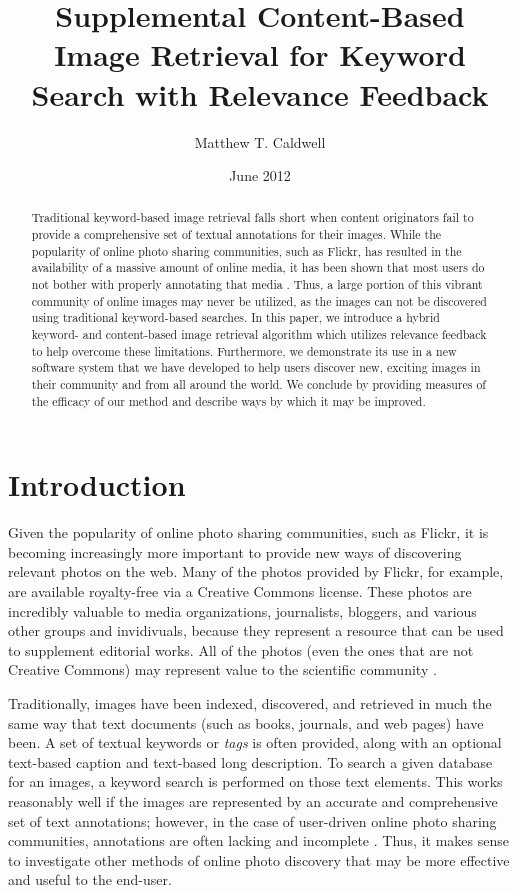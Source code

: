 \documentclass{article}
\title{Supplemental Content-Based Image Retrieval for Keyword Search with Relevance Feedback}
\author{Matthew T. Caldwell}
\date{June 2012}
\begin{document}
\maketitle

\begin{abstract}
Traditional keyword-based image retrieval falls short when content originators fail to provide a comprehensive set of
textual annotations for their images.  While the popularity of online photo sharing communities, such as
Flickr, has resulted in the availability of a massive amount of online media, it has been shown that most users do not bother
with properly annotating that media \cite{whywetag}.  Thus, a large portion of this vibrant community of online images
may never be
utilized, as the images can not be discovered using traditional keyword-based searches.  In this paper, we introduce a
hybrid keyword- and content-based image retrieval algorithm which utilizes relevance feedback to help overcome these
limitations.  Furthermore, we demonstrate its use in a new software system that we have developed to help users
discover new, exciting images in their community and from all around the world.  We conclude by providing measures of the
efficacy of our method
and describe ways by which it may be improved.
\end{abstract}

\section{Introduction}
Given the popularity of online photo sharing communities, such as Flickr, it is becoming increasingly more important to
provide new ways of discovering relevant photos on the web.  Many of the photos provided by Flickr, for example, are
available royalty-free via a Creative Commons license.  These photos are incredibly valuable to media organizations,
journalists, bloggers, and various other groups and invidivuals, because they represent a resource that can be used to
supplement editorial works.  All of the photos (even the ones that are not Creative Commons) may represent value to
the scientific community \cite{academic}.

Traditionally, images have been indexed, discovered, and retrieved in much the same way that text documents (such as
books, journals, and web pages) have been.  A set of textual keywords or {\em tags} is often provided, along with an
optional text-based caption and text-based long description.  To search a given database for an images, a keyword
search is performed on those text elements.  This works reasonably well if the images are represented by an
accurate and comprehensive set of text annotations; however, in the case of user-driven online photo sharing communities,
annotations are often lacking and incomplete \cite{whywetag}.  Thus, it makes sense to investigate other methods of
online photo discovery that may be more effective and useful to the end-user.
\end{document}
